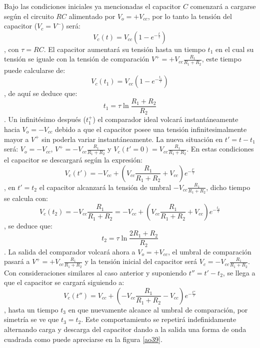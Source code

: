 Bajo las condiciones iniciales ya mencionadas el capacitor $C$
comenzará a cargarse según el circuito $RC$ alimentado por
$V_o=+V_{cc}$, por lo tanto la tensión del capacitor ($V_c=V^-$)
será:
$$V_c(t)=V_{cc}(1-e^{\displaystyle -\frac{\displaystyle t}{\displaystyle \tau}})$$, con
$\tau=RC$. El capacitor aumentará su tensión hasta un tiempo $t_1$
en el cual su tensión se iguale con la tensión de comparación
$V^+=+V_{cc}\frac{\displaystyle R_1}{\displaystyle R_1+R_2}$, este
tiempo puede calcularse de:
$$V_c(t_1)=V_{cc}(1-e^{\displaystyle -\frac{\displaystyle t_1}{\displaystyle
		\tau}})$$, de aquí se deduce que:
$$t_1=\tau \ln {\frac {\displaystyle R_1+R_2}{\displaystyle R_2}}$$. Un infinitésimo después
($t_1^+$) el comparador ideal volcará
instantáneamente hacia $V_o=-V_{cc}$ debido a que el capacitor posee
una tensión infinitesimalmente mayor a $V^+$ sin poderla variar
instantáneamente. La nueva situación en $t'=t-t_1$ será:
$V_o=-V_{cc}$, $V^+=-V_{cc}\frac{\displaystyle R_1}{\displaystyle
	R_1+R_2}$ y $V_c(t'=0)=V_{cc}\frac{\displaystyle R_1}{\displaystyle
	R_1+R_2}$. En estas condiciones el capacitor se descargará según la
expresión:
$$V_c(t')=-V_{cc}+(V_{cc}\frac{\displaystyle R_1}{\displaystyle
	R_1+R_2}+V_{cc})e^{\displaystyle -\frac{\displaystyle
		t'}{\displaystyle \tau}}$$, en $t'=t_2$ el capacitor alcanzará la
tensión de umbral $-V_{cc}\frac{\displaystyle R_1}{\displaystyle
	R_1+R_2}$, dicho tiempo se calcula con:
$$V_c(t_2)=-V_{cc}\frac{\displaystyle R_1}{\displaystyle
	R_1+R_2}=-V_{cc}+(V_{cc}\frac{\displaystyle R_1}{\displaystyle
	R_1+R_2}+V_{cc})e^{\displaystyle -\frac{\displaystyle
		t_2}{\displaystyle \tau}}$$, se deduce que:
$$t_2=\tau \ln {\frac {\displaystyle 2R_1+R_2}{\displaystyle R_2}}
$$. La salida del comparador volcará ahora a $V_o=+V_{cc}$, el
umbral de comparación pasará a $V^+=+V_{cc}\frac{\displaystyle
	R_1}{\displaystyle R_1+R_2}$ y la tensión inicial del capacitor será
$V_c=-V_{cc}\frac{\displaystyle R_1}{\displaystyle R_1+R_2}$. Con
consideraciones similares al caso anterior y suponiendo
$t''=t'-t_2$, se llega a que el capacitor se cargará siguiendo a:
$$V_c(t'')=V_{cc}+(-V_{cc}\frac{\displaystyle R_1}{\displaystyle
	R_1+R_2}-V_{cc})e^{\displaystyle -\frac{\displaystyle
		t''}{\displaystyle \tau}}$$, hasta un tiempo $t_3$ en que
nuevamente alcance al umbral de comparación, por simetría se ve que $t_3=t_2$. Este comportamiento se
repetirá indefinidamente alternando carga y descarga del capacitor
dando a la salida una forma de onda cuadrada como puede apreciarse
en la figura \ref{ao39}.

